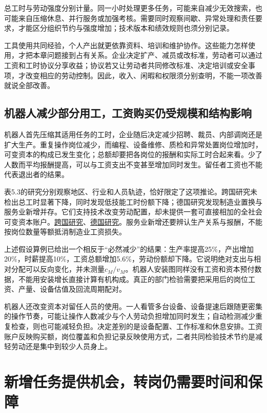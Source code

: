 \documentclass[UTF8,fontset=windows,12pt,a4paper,oneside,openany]{ctexbook}
\begin{document}
总工时与劳动强度分别计量。同一小时处理更多任务，可能来自减少无效搜索，也可能来自压缩休息、并行服务或加强考核。需要同时观察间歇、异常处理和责任要求，才能区分组织节约与强度增加；技术版本和绩效规则也须分别记录。

工具使用共同经验，个人产出就更依靠资料、培训和维护协作。这些能力怎样使用，才把本章问题接到占有关系。企业决定扩产、减员或改标准，劳动者可以通过工资和工时协议分享收益；协议若又让劳动者共同修改标准、决定培训或安全事项，才改变相应的劳动控制。因此，收入、闲暇和权限须分别查明，不能一项改善就说全部改善。

\subsection{机器人减少部分用工，工资购买仍受规模和结构影响}

机器人首先压缩其适用任务的工时，企业随后决定减少招聘、裁员、内部调岗还是扩大生产。重复操作岗位减少，而编程、设备维修、质检和异常处置岗位增加时，可变资本的构成已发生变化；总额却要把各岗位的报酬和实际工时合起来看。少了人数而平均报酬提高，可以与工资支出不变甚至增加同时发生。留任者工资也不能代表退出者的结果。

表5.3的研究分别观察地区、行业和人员轨迹，恰好限定了这项推论。跨国研究未检出总工时显著下降，同时发现低技能工时份额下降；德国研究发现制造业置换与服务业新增并存。它们支持技术改变劳动配置，却未提供一套可直接相加的全社会可变资本账户。\href{https://doi.org/10.1162/rest_a_00754}{跨国研究}、\href{https://doi.org/10.1093/jeea/jvab012}{德国研究}。服务业新增还要辨认生产关系与报酬，不能按岗位数量等额抵消制造业工资损失。

上述假设算例已给出一个相反于“必然减少”的结果：生产率提高25\%，产出增加20\%，时薪提高10\%，工资总额增加5.6\%，劳动份额却下降。它说明绝对支出与相对分配可以反向变化，并未测量$c_M/v_M$。机器人安装图同样没有工资和资本预付数据，不能用安装增长直接计算有机构成。真正的部门检验需要把采用后的岗位工资、产量、设备估值及回流周期配对。

机器人还改变资本对留任人员的使用。一人看管多台设备、设备提速后跟随更密集的操作节奏，可能让操作人数减少与个人劳动负担增加同时发生；自动检测减少重复检查，则也可能减轻负担。决定差别的是设备配置、工作标准和休息安排。工资账户反映购买额，岗位覆盖和负担记录反映使用方式，二者共同检验技术节约是减轻劳动还是集中到较少人员身上。

\section{新增任务提供机会，转岗仍需要时间和保障}
\end{document}

